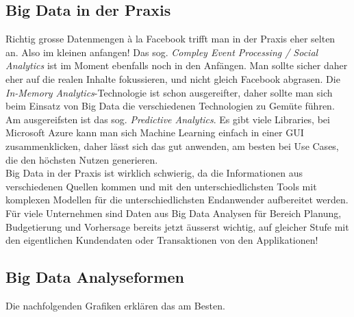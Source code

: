 \subsection{Big Data in der Praxis}
Richtig grosse Datenmengen à la Facebook trifft man in der Praxis eher selten an. Also im kleinen anfangen! Das sog. \textit{Compley Event Processing / Social Analytics} ist im Moment ebenfalls noch in den Anfängen. Man sollte sicher daher eher auf die realen Inhalte fokussieren, und nicht gleich Facebook abgrasen. Die \textit{In-Memory Analytics}-Technologie ist schon ausgereifter, daher sollte man sich beim Einsatz von Big Data die verschiedenen Technologien zu Gemüte führen. Am ausgereifsten ist das sog. \textit{Predictive Analytics}. Es gibt viele Libraries, bei Microsoft Azure kann man sich Machine Learning einfach in einer GUI zusammenklicken, daher lässt sich das gut anwenden, am besten bei Use Cases, die den höchsten Nutzen generieren. \\
Big Data in der Praxis ist wirklich schwierig, da die Informationen aus verschiedenen Quellen kommen und mit den unterschiedlichsten Tools mit komplexen Modellen für die unterschiedlichsten Endanwender aufbereitet werden.\\
Für viele Unternehmen sind Daten aus Big Data Analysen für Bereich Planung, Budgetierung und Vorhersage bereits jetzt äusserst wichtig, auf gleicher Stufe mit den eigentlichen Kundendaten oder Transaktionen von den Applikationen!
\subsection{Big Data Analyseformen}
Die nachfolgenden Grafiken erklären das am Besten.

